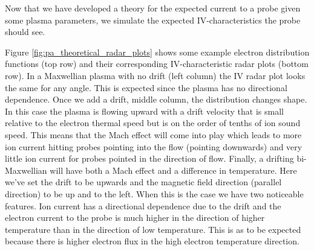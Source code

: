 
Now that we have developed a theory for the expected current to a probe given some plasma parameters, we simulate the expected IV-characteristics the probe should see.





Figure \ref{fig:pa_theoretical_radar_plots} shows some example electron distribution functions (top row) and their corresponding IV-characteristic radar plots (bottom row). In a Maxwellian plasma with no drift (left column) the IV radar plot looks the same for any angle. This is expected since the plasma has no directional dependence. Once we add a drift, middle column, the distribution changes shape. In this case the plasma is flowing upward with a drift velocity that is small relative to the electron thermal speed but is on the order of tenths of ion sound speed. This means that the Mach effect will come into play which leads to more ion current hitting probes pointing into the flow (pointing downwards) and very little ion current for probes pointed in the direction of flow. Finally, a drifting bi-Maxwellian will have both a Mach effect and a difference in temperature. Here we've set the drift to be upwards and the magnetic field direction (parallel direction) to be up and to the left. When this is the case we have two noticeable features. Ion current has a directional dependence due to the drift and the electron current to the probe is much higher in the direction of higher temperature than in the direction of low temperature. This is as to be expected because there is higher electron flux in the high electron temperature direction.

